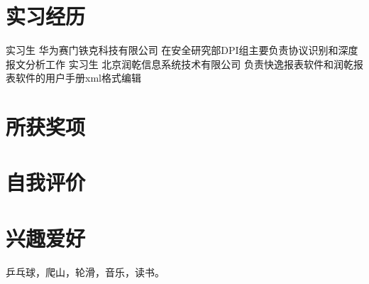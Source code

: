 \documentclass[a4paper]{moderncv}
\begin{document}
\begin{CJK*}{UTF8}{gbsn}
\section{实习经历}
{实习生 华为赛门铁克科技有限公司 在安全研究部DPI组主要负责协议识别和深度报文分析工作}
{实习生 北京润乾信息系统技术有限公司 负责快逸报表软件和润乾报表软件的用户手册xml格式编辑}

\section{所获奖项}

\section{自我评价}

\section{兴趣爱好}
\cvitem{}
{
乒乓球，爬山，轮滑，音乐，读书。
}
\closesection
\end{CJK*}
\end{document}
